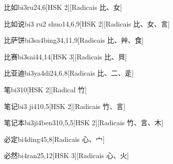 \begin{entry}{比如}{bi3ru2}{4,6}[HSK 2][Radicais ⽐、⼥]
\end{entry}

\begin{entry}{比如说}{bi3 ru2 shuo1}{4,6,9}[HSK 2][Radicais ⽐、⼥、⾔]
\end{entry}

\begin{entry}{比萨饼}{bi3sa4bing3}{4,11,9}[Radicais ⽐、⾋、⾷]
\end{entry}

\begin{entry}{比赛}{bi3sai4}{4,14}[HSK 3][Radicais ⽐、⾙]
\end{entry}

\begin{entry}{比亚迪}{bi3ya4di2}{4,6,8}[Radicais ⽐、⼆、⾡]
\end{entry}

\begin{entry}{笔}{bi3}{10}[HSK 2][Radical ⽵]
\end{entry}

\begin{entry}{笔记}{bi3 ji4}{10,5}[HSK 2][Radicais ⽵、⾔]
\end{entry}

\begin{entry}{笔记本}{bi3ji4ben3}{10,5,5}[HSK 2][Radicais ⽵、⾔、⽊]
\end{entry}

\begin{entry}{必定}{bi4ding4}{5,8}[Radicais ⼼、⼧]
\end{entry}

\begin{entry}{必然}{bi4ran2}{5,12}[HSK 3][Radicais ⼼、⽕]
\end{entry}

